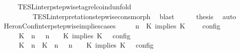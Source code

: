 \begin{isabellebody}
\ \ \ \ \ \ \isamarkupfalse%
\ TESL{\isacharunderscore}interp{\isacharunderscore}stepwise{\isacharunderscore}tagrel{\isacharunderscore}coind{\isacharunderscore}unfold\isanewline
\ \ \ \ \ \ \ \ \ \ \ \ TESL{\isacharunderscore}interpretation{\isacharunderscore}stepwise{\isacharunderscore}cons{\isacharunderscore}morph\ \isamarkupfalse%
\ blast\isanewline
\ \ \ \ \isamarkupfalse%
\ {\isacharquery}thesis\ \isamarkupfalse%
\ auto\isanewline
\ \ \isamarkupfalse%
\isanewline
{}\isamarkupfalse%
%
\endisatagproof
{\isafoldproof}%
%
\isadelimproof
\isanewline
%
\endisadelimproof
\isanewline
{}\isamarkupfalse%
\ HeronConf{\isacharunderscore}interp{\isacharunderscore}stepwise{\isacharunderscore}implies{\isacharunderscore}cases{\isacharcolon}\isanewline
\ \ \ {\isacartoucheopen}{\isasymlbrakk}\ {\isasymGamma}{\isacharcomma}\ n\ {\isasymturnstile}\ {\isacharparenleft}{\isacharparenleft}K\ implies\ K\ {\isacharhash}\ {\isasymPsi}{\isacharparenright}\ {\isasymtriangleright}\ {\isasymPhi}\ {\isasymrbrakk}\isactrlsub c\isactrlsub o\isactrlsub n\isactrlsub f\isactrlsub i\isactrlsub g\isanewline
\ \ \ \ \ \ {\isacharequal}\ {\isasymlbrakk}\ {\isacharparenleft}{\isacharparenleft}K\ {\isasymnot}{\isasymUp}\ n{\isacharparenright}\ {\isacharhash}\ {\isasymGamma}{\isacharparenright}{\isacharcomma}\ n\ {\isasymturnstile}\ {\isasymPsi}\ {\isasymtriangleright}\ {\isacharparenleft}{\isacharparenleft}K\ implies\ K\ {\isacharhash}\ {\isasymPhi}{\isacharparenright}\ {\isasymrbrakk}\isactrlsub c\isactrlsub o\isactrlsub n\isactrlsub f\isactrlsub i\isactrlsub g\isanewline
\ \ \ \ \ \ {\isasymunion}\ {\isasymlbrakk}\ {\isacharparenleft}{\isacharparenleft}K\ {\isasymUp}\ n{\isacharparenright}\ {\isacharhash}\ {\isacharparenleft}K\ {\isasymUp}\ n{\isacharparenright}\ {\isacharhash}\ {\isasymGamma}{\isacharparenright}{\isacharcomma}\ n\ {\isasymturnstile}\ {\isasymPsi}\ {\isasymtriangleright}\ {\isacharparenleft}{\isacharparenleft}K\ implies\ K\ {\isacharhash}\ {\isasymPhi}{\isacharparenright}\ {\isasymrbrakk}\isactrlsub c\isactrlsub o\isactrlsub n\isactrlsub f\isactrlsub i\isactrlsub g{\isacartoucheclose}\isanewline
%
\isadelimproof
%
\endisadelimproof
%
\isatagproof
{}\isamarkupfalse%

\end{isabellebody}
